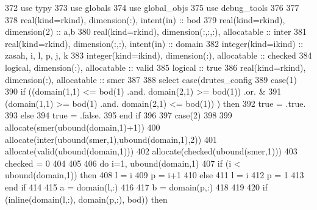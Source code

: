 \begin{DoxyCode}
372     \textcolor{keywordtype}{use }typy
373     \textcolor{keywordtype}{use }globals
374     \textcolor{keywordtype}{use }global_objs
375     \textcolor{keywordtype}{use }debug_tools
376 
377     
378     \textcolor{keywordtype}{real(kind=rkind)}, \textcolor{keywordtype}{dimension(:)}, \textcolor{keywordtype}{intent(in)} :: bod
379     \textcolor{keywordtype}{real(kind=rkind)}, \textcolor{keywordtype}{dimension(2)} :: a,b
380     \textcolor{keywordtype}{real(kind=rkind)}, \textcolor{keywordtype}{dimension(:,:,:)}, \textcolor{keywordtype}{allocatable} :: inter
381     \textcolor{keywordtype}{real(kind=rkind)}, \textcolor{keywordtype}{dimension(:,:)}, \textcolor{keywordtype}{intent(in)}  :: domain
382     \textcolor{keywordtype}{integer(kind=ikind)} :: zasah, i, l, p, j, k
383     \textcolor{keywordtype}{integer(kind=ikind)}, \textcolor{keywordtype}{dimension(:)}, \textcolor{keywordtype}{allocatable} :: checked
384     \textcolor{keywordtype}{logical}, \textcolor{keywordtype}{dimension(:)}, \textcolor{keywordtype}{allocatable} :: valid
385     \textcolor{keywordtype}{logical} :: true
386     \textcolor{keywordtype}{real(kind=rkind)}, \textcolor{keywordtype}{dimension(:)}, \textcolor{keywordtype}{allocatable} :: smer
387     
388     \textcolor{keywordflow}{select case}(drutes_config%
389       \textcolor{keywordflow}{case}(1)
390         \textcolor{keywordflow}{if} ((domain(1,1) <= bod(1) .and. domain(2,1) >= bod(1)) .or. &
391             (domain(1,1) >= bod(1) .and. domain(2,1) <= bod(1)) ) \textcolor{keywordflow}{then}
392           true = .true.
393         \textcolor{keywordflow}{else}
394           true = .false.
395 \textcolor{keywordflow}{        end if}
396 
397       \textcolor{keywordflow}{case}(2)
398 
399         \textcolor{keyword}{allocate}(smer(ubound(domain,1)+1))
400         \textcolor{keyword}{allocate}(inter(ubound(smer,1),ubound(domain,1),2))
401         \textcolor{keyword}{allocate}(valid(ubound(domain,1)))
402         \textcolor{keyword}{allocate}(checked(ubound(smer,1)))
403         checked = 0
404 
405 
406         \textcolor{keywordflow}{do} i=1, ubound(domain,1)
407           \textcolor{keywordflow}{if} (i < ubound(domain,1)) \textcolor{keywordflow}{then}
408             l = i
409             p = i+1
410           \textcolor{keywordflow}{else}
411             l = i
412             p = 1
413 \textcolor{keywordflow}{          end if}
414           
415           a = domain(l,:)
416     
417           b = domain(p,:)
418           
419 
420           \textcolor{keywordflow}{if} (inline(domain(l,:), domain(p,:), bod)) \textcolor{keywordflow}{then}

\end{DoxyCode}
